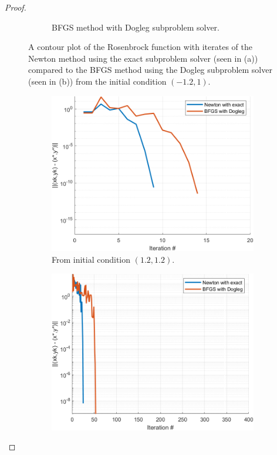 \documentclass[12pt]{report}
\begin{document}
\begin{problem}
\begin{proof}
\begin{figure}[H]
\begin{subfigure}[b]{0.5\linewidth}
        \caption{BFGS method with Dogleg subproblem solver.}
        \label{fig4-2:b}
        \vspace{4ex}
    \end{subfigure}
    \caption{A contour plot of the Rosenbrock function with iterates of the Newton method using the exact subproblem solver (seen in (a)) compared to the BFGS method using the Dogleg subproblem solver (seen in (b)) from the initial condition $(-1.2,1)$.}
    \label{fig4-2}
\end{figure}
\begin{figure}[H]
    \begin{subfigure}[b]{0.5\linewidth}
        \centering
        \includegraphics[width=\linewidth]{images/4-norm1.2,1.2.png}
        \caption{From initial condition $(1.2,1.2)$.}
        \label{fig3:a}
        \vspace{4ex}
    \end{subfigure}%
    \begin{subfigure}[b]{0.5\linewidth}
        \centering
        \includegraphics[width=\linewidth]{images/4-norm-1.2,1.png}

\end{subfigure}
\end{figure}
\end{proof}
\end{problem}
\end{document}
